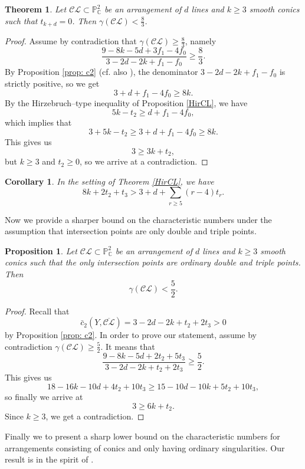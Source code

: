 \documentclass[12pt]{amsart}
\theoremstyle{plain}
\newtheorem{theorem}[thm]{Theorem}
\newtheorem{proposition}[thm]{Proposition}
\newtheorem{corollary}[thm]{Corollary}
\theoremstyle{definition}
\renewcommand\geq{\geqslant}
\begin{document}
\begin{theorem}
\label{charn}
Let $\mathcal{CL} \subset \mathbb{P}^{2}_{\mathbb{C}}$ be an arrangement of $d$ lines and $k\geq 3$ smooth conics such that $t_{k+d}=0$. Then $\gamma(\mathcal{CL}) < \frac{8}{3}$.
\end{theorem}
\begin{proof}
 Assume by contradiction that $\gamma(\mathcal{CL}) \geq \frac{8}{3}$, namely 
$$\frac{9-8k-5d+3f_{1}-4f_{0}}{3-2d-2k+f_{1}-f_{0}}\geq \frac{8}{3}.$$
By  Proposition \ref{prop: c2} (cf.  also \cite[Proposition 6.2]{PSz2023}), the denominator $3-2d-2k+f_{1}-f_{0}$ is strictly positive, so we get 
$$3+d+f_{1}-4f_{0}\geq 8k.$$
By the Hirzebruch--type inequality of Proposition \ref{HirCL}, we have 
$$5k-t_{2}\geq d+f_{1}-4f_{0},$$
which implies that
$$3+5k-t_{2} \geq 3+d+f_{1}-4f_{0} \geq 8k.$$
This gives us
$$3\geq 3k+t_{2},$$
but $k\geq 3$ and $t_{2}\geq 0$, so we arrive at a contradiction.
\end{proof}
\begin{corollary}
In the setting of Theorem \ref{HirCL}, we have
$$8k + 2t_{2}+t_{3} > 3+d + \sum_{r\geq 5}(r-4)t_{r}.$$
\end{corollary}
Now we provide a sharper bound on the characteristic numbers under the assumption that intersection points are only double and triple points.
\begin{proposition}
Let $\mathcal{CL} \subset \mathbb{P}^{2}_{\mathbb{C}}$ be an arrangement of $d$ lines and $k\geq 3$ smooth conics such that the only intersection points are ordinary double and triple points. Then
 $$\gamma(\mathcal{CL}) < \frac{5}{2}.$$
\end{proposition}
\begin{proof}
Recall that
$$\bar{c}_{2}(Y,\overline{\mathcal{CL}})=3-2d-2k+t_{2} + 2t_{3}> 0$$ 
by Proposition \ref{prop: c2}. In order to prove our statement, assume by contradiction $\gamma(\mathcal{CL}) \geq \frac{5}{2}$. It means that
$$\frac{9-8k-5d+2t_{2}+5t_{3}}{3-2d-2k+t_{2}+2t_{3}}\geq \frac{5}{2}.$$
This gives us
$$18 - 16k - 10d +4t_{2} + 10t_{3} \geq 15 - 10d - 10k + 5t_{2} + 10t_{3},$$
so finally we arrive at
$$3 \geq 6k+t_{2}.$$
Since $k\geq 3$, we get a contradiction.
\end{proof}

Finally  we  to present a sharp lower bound on the characteristic numbers for arrangements consisting of conics and only having ordinary singularities. Our result is in the spirit of \cite[Proposition 3.4]{geo}.
\end{document}
